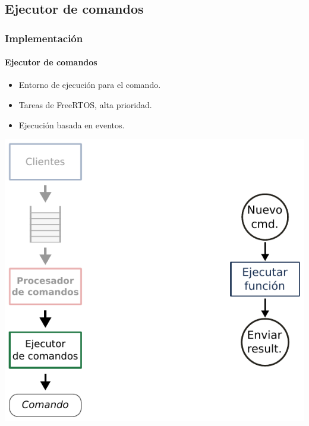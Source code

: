 \documentclass[xcolor=dvipsnames]{beamer}
\begin{document}
    \subsection{Ejecutor de comandos}
    \begin{frame}
        \frametitle{Implementación}
        \framesubtitle{Ejecutor de comandos}
        
        \begin{itemize}
            \item Entorno de ejecución para el comando.
            \item Tareas de FreeRTOS, alta prioridad.
            \item Ejecución basada en eventos.
        \end{itemize}
        
        \begin{center}
            \includegraphics[height=0.75\textheight]{img/implementacion_executer.pdf}
        \end{center}
        
    \end{frame}
    
\end{document}
